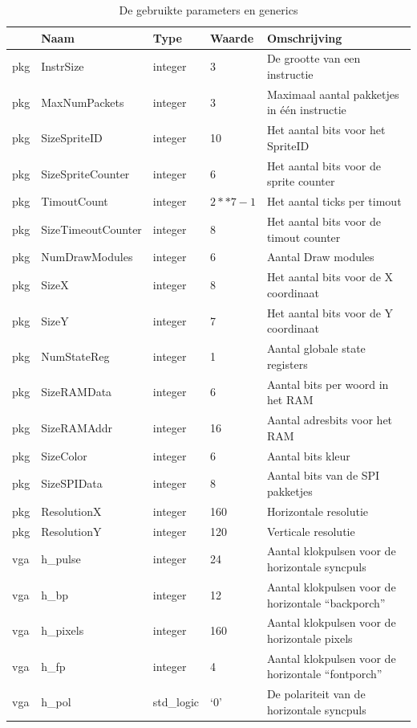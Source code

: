 \documentclass{scrartcl} %
\begin{document}
\begin{table}[H]
\centering
\caption{De gebruikte parameters en generics}
\label{tab:spec-params}
\begin{tabular}{l l l l l}
	\hline\hline
 	 & Naam & Type & Waarde & Omschrijving\\
 	\hline
	pkg & InstrSize & integer & 3 & De grootte van een instructie\\ 
	pkg & MaxNumPackets & integer & 3 & Maximaal aantal pakketjes in één instructie\\ 
	pkg & SizeSpriteID & integer & 10 & Het aantal bits voor het SpriteID \\
	pkg & SizeSpriteCounter & integer & 6 & Het aantal bits voor de sprite counter\\
	pkg & TimoutCount & integer & $2**7-1$ & Het aantal ticks per timout\\
	pkg & SizeTimeoutCounter & integer & 8 & Het aantal bits voor de timout counter\\
	pkg & NumDrawModules & integer & 6 & Aantal Draw modules\\ 
	pkg & SizeX & integer & 8 & Het aantal bits voor de X coordinaat\\
	pkg & SizeY & integer & 7 & Het aantal bits voor de Y coordinaat\\
	pkg & NumStateReg & integer & 1 & Aantal globale state registers\\
	pkg & SizeRAMData & integer & 6 & Aantal bits per woord in het RAM\\
	pkg & SizeRAMAddr & integer & 16 & Aantal adresbits voor het RAM\\
	pkg & SizeColor & integer & 6 & Aantal bits kleur\\
	pkg & SizeSPIData & integer & 8 & Aantal bits van de SPI pakketjes\\
	pkg & ResolutionX & integer & 160 & Horizontale resolutie \\
	pkg & ResolutionY & integer & 120 & Verticale resolutie \\
	vga & h\_pulse & integer & 24 & Aantal klokpulsen voor de horizontale syncpuls\\ 
	vga & h\_bp & integer & 12 & Aantal klokpulsen voor de horizontale “backporch” \\ 
	vga & h\_pixels & integer & 160 & Aantal klokpulsen voor de horizontale pixels \\ 
	vga & h\_fp & integer & 4 & Aantal klokpulsen voor de horizontale “fontporch” \\ 
	vga & h\_pol & std\_logic & ‘0’ & De polariteit van de horizontale syncpuls\\ 

\end{tabular}
\end{table}
\end{document}
